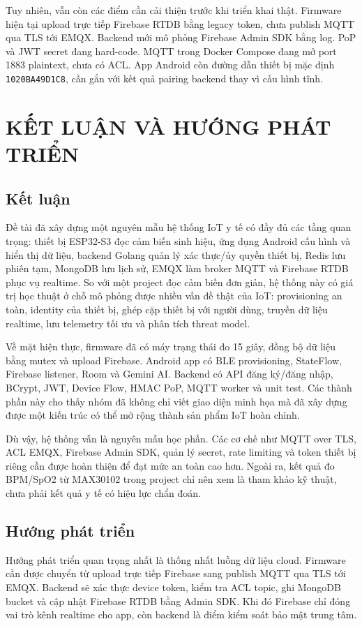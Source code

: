 \documentclass[a4paper,13pt,3p,oneside]{report}
\begin{document}
Tuy nhiên, vẫn còn các điểm cần cải thiện trước khi triển khai thật. Firmware hiện tại upload trực tiếp Firebase RTDB bằng legacy token, chưa publish MQTT qua TLS tới EMQX. Backend mới mô phỏng Firebase Admin SDK bằng log. PoP và JWT secret đang hard-code. MQTT trong Docker Compose đang mở port 1883 plaintext, chưa có ACL. App Android còn đường dẫn thiết bị mặc định \texttt{1020BA49D1C8}, cần gắn với kết quả pairing backend thay vì cấu hình tĩnh.

\chapter{KẾT LUẬN VÀ HƯỚNG PHÁT TRIỂN}
\section{Kết luận}
Đề tài đã xây dựng một nguyên mẫu hệ thống IoT y tế có đầy đủ các tầng quan trọng: thiết bị ESP32-S3 đọc cảm biến sinh hiệu, ứng dụng Android cấu hình và hiển thị dữ liệu, backend Golang quản lý xác thực/ủy quyền thiết bị, Redis lưu phiên tạm, MongoDB lưu lịch sử, EMQX làm broker MQTT và Firebase RTDB phục vụ realtime. So với một project đọc cảm biến đơn giản, hệ thống này có giá trị học thuật ở chỗ mô phỏng được nhiều vấn đề thật của IoT: provisioning an toàn, identity của thiết bị, ghép cặp thiết bị với người dùng, truyền dữ liệu realtime, lưu telemetry tối ưu và phân tích threat model.

Về mặt hiện thực, firmware đã có máy trạng thái đo 15 giây, đồng bộ dữ liệu bằng mutex và upload Firebase. Android app có BLE provisioning, StateFlow, Firebase listener, Room và Gemini AI. Backend có API đăng ký/đăng nhập, BCrypt, JWT, Device Flow, HMAC PoP, MQTT worker và unit test. Các thành phần này cho thấy nhóm đã không chỉ viết giao diện minh họa mà đã xây dựng được một kiến trúc có thể mở rộng thành sản phẩm IoT hoàn chỉnh.

Dù vậy, hệ thống vẫn là nguyên mẫu học phần. Các cơ chế như MQTT over TLS, ACL EMQX, Firebase Admin SDK, quản lý secret, rate limiting và token thiết bị riêng cần được hoàn thiện để đạt mức an toàn cao hơn. Ngoài ra, kết quả đo BPM/SpO2 từ MAX30102 trong project chỉ nên xem là tham khảo kỹ thuật, chưa phải kết quả y tế có hiệu lực chẩn đoán.

\section{Hướng phát triển}
Hướng phát triển quan trọng nhất là thống nhất luồng dữ liệu cloud. Firmware cần được chuyển từ upload trực tiếp Firebase sang publish MQTT qua TLS tới EMQX. Backend sẽ xác thực device token, kiểm tra ACL topic, ghi MongoDB bucket và cập nhật Firebase RTDB bằng Admin SDK. Khi đó Firebase chỉ đóng vai trò kênh realtime cho app, còn backend là điểm kiểm soát bảo mật trung tâm.
\end{document}
